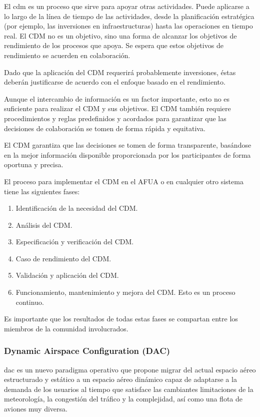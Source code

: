 El \acrfull{cdm} es un proceso que sirve para apoyar otras actividades. Puede aplicarse a lo largo de la línea de tiempo de las actividades, desde la planificación estratégica (por ejemplo, las inversiones en infraestructuras) hasta las operaciones en tiempo real. El CDM no es un objetivo, sino una forma de alcanzar los objetivos de rendimiento de los procesos que apoya. Se espera que estos objetivos de rendimiento se acuerden en colaboración. 

Dado que la aplicación del CDM requerirá probablemente inversiones, éstas deberán justificarse de acuerdo con el enfoque basado en el rendimiento.

Aunque el intercambio de información es un factor importante, esto no es suficiente para realizar el CDM y sus objetivos. El CDM también requiere procedimientos y reglas predefinidos y acordados para garantizar que las decisiones de colaboración se tomen de forma rápida y equitativa.

El CDM garantiza que las decisiones se tomen de forma transparente, basándose en la mejor información disponible proporcionada por los participantes de forma oportuna y precisa.

El proceso para implementar el CDM en el AFUA o en cualquier otro sistema tiene las siguientes fases:

\begin{enumerate}
    \item Identificación de la necesidad del CDM.
    \item Análisis del CDM.
    \item Especificación y verificación del CDM.
    \item Caso de rendimiento del CDM.
    \item Validación y aplicación del CDM.
    \item Funcionamiento, mantenimiento y mejora del CDM. Esto es un proceso continuo.
\end{enumerate}

Es importante que los resultados de todas estas fases se compartan entre los miembros de la comunidad involucrados.

\subsubsection{Dynamic Airspace Configuration (DAC)}

\acrfull{dac} es un nuevo paradigma operativo que propone migrar del actual espacio aéreo estructurado y estático a un espacio aéreo dinámico capaz de adaptarse a la demanda de los usuarios al tiempo que satisface las cambiantes limitaciones de la meteorología, la congestión del tráfico y la complejidad, así como una flota de aviones muy diversa.

